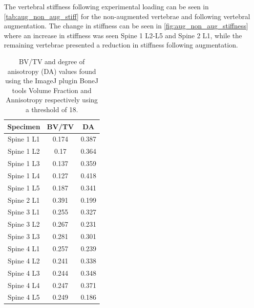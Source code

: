 The vertebral stiffness following experimental loading can be seen in
\cref{tab:aug_non_aug_stiff} for the non-augmented vertebrae and following
vertebral augmentation.
The change in stiffness can be seen in \cref{fig:aug_non_aug_stiffness} where
an increase in stiffness was seen Spine 1 L2-L5 and Spine 2 L1, while the
remaining vertebrae presented a reduction in stiffness following
augmentation.


\begin{table}[ht!]
	\caption{BV/TV and degree of anisotropy (DA) values found using the ImageJ
    plugin BoneJ tools Volume Fraction and Annisotropy respectively using a
    threshold of 18.}
	\label{tab:bv_tv_anis}
	\centering
	\begin{tabular}{c|c|c}
    Specimen                       & BV/TV & DA\\ \hline \hline
    Spine 1 L1  & 0.174 & 0.387 \\
    Spine 1 L2  & 0.17  & 0.364\\
    Spine 1 L3  & 0.137 & 0.359\\
    Spine 1 L4  & 0.127 & 0.418\\
    Spine 1 L5  & 0.187 & 0.341\\
    Spine 2 L1  & 0.391 & 0.199\\
    Spine 3 L1  & 0.255 & 0.327\\
    Spine 3 L2  & 0.267 & 0.231\\
    Spine 3 L3  & 0.281 & 0.301\\
    Spine 4 L1  & 0.257 & 0.239\\
    Spine 4 L2  & 0.241 & 0.338\\
    Spine 4 L3  & 0.244 & 0.348\\
    Spine 4 L4  & 0.247 & 0.371\\
    Spine 4 L5  & 0.249 & 0.186\\
    \hline
	\end{tabular}
\end{table}


